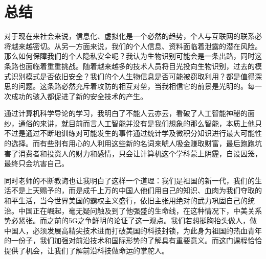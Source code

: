 \documentclass{article}
\begin{document}


\section{总结}
	对于现在来社会来说，信息化、虚拟化是一个必然的趋势，个人与互联网的联系必将越来越密切。从另一方面来说，我们的个人信息、资料面临着泄露的潜在风险。那么如何保障我们的个人隐私安全呢？我认为生物识别可能会是一条出路，同时这条路也面临着重重挑战。随着越来越多的技术人员将目光投向生物识别，过去的模式识别模式是否依旧安全？我们的个人生物信息是否可能被窃取利用？都是值得深思的问题。这条路必然充斥着攻防的相互对垒，当我相信它的前景是光明的。每一次成功的骇入都促进了新的安全技术的产生。\par 
	通过计算机科学导论的学习，我明白了不能人云亦云，看破了人工智能神秘的面纱，通俗的来讲，就目前而言人工智能并没有是我们想象的那么智能，本质上他只不过是通过不断地训练对可能发生的事件通过统计学及微积分知识进行最大可能性的选择。而有些别有用心的人利用这些新的名词来唬人吸金赚取财富，最后跑跑坑害了消费者和投资人的财力和感情，只会让计算机这个学科蒙上阴霾，自设囚笼，最终只会坑害自己。\par 
	同时老师的不断教诲也让我明白了这样一个道理：我们是祖国的新一代，我们的生活不是上天赐予的，而是成千上万的中国人他们用自己的知识、血肉为我们夺取的和平生活，当今世界美国的霸权主义盛行，依旧主张用绝对的武力巩固自己的统治。中国正在崛起，毫无疑问触及到了他强盛的生命线，在这种情况下，中美关系势必紧张。而之前的5G之争鲜明的论证了这一观点。我们若想挺胸抬头做人，做中国人，必须发展高精尖技术进而打破美国的科技封锁，为此身为祖国的热血青年的一份子，我们加强对前沿技术和国际形势的了解具有重要意义。而这门课程恰恰提供了机会，让我们了解前沿科技做命运的掌舵人。\par 
\end{document}
